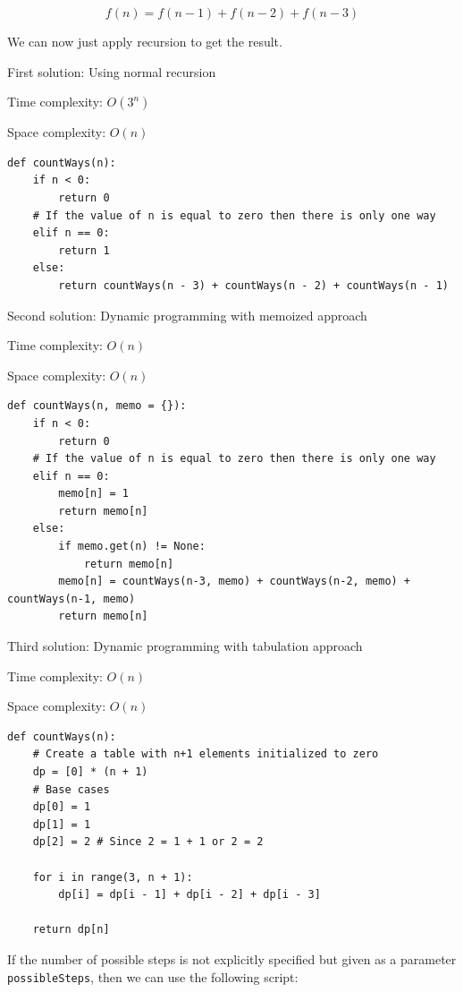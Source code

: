\documentclass[a4paper,11pt]{book}
\begin{document}
$$f(n) = f(n-1)+f(n-2)+f(n-3)$$

\noindent We can now just apply recursion to get the result.
\vspace{3mm}

\noindent First solution: Using normal recursion

\noindent Time complexity: $O(3^n)$

\noindent Space complexity: $O(n)$

\begin{lstlisting}
def countWays(n):
    if n < 0:
        return 0
    # If the value of n is equal to zero then there is only one way
    elif n == 0:
        return 1
    else:
        return countWays(n - 3) + countWays(n - 2) + countWays(n - 1)
\end{lstlisting}

\noindent Second solution: Dynamic programming with memoized approach

\noindent Time complexity: $O(n)$

\noindent Space complexity: $O(n)$

\begin{lstlisting}
def countWays(n, memo = {}):
    if n < 0:
        return 0
    # If the value of n is equal to zero then there is only one way
    elif n == 0:
        memo[n] = 1
        return memo[n]
    else:
        if memo.get(n) != None:
            return memo[n]
        memo[n] = countWays(n-3, memo) + countWays(n-2, memo) + countWays(n-1, memo)
        return memo[n]
\end{lstlisting}

\noindent Third solution: Dynamic programming with tabulation approach

\noindent Time complexity: $O(n)$

\noindent Space complexity: $O(n)$

\begin{lstlisting}
def countWays(n):
    # Create a table with n+1 elements initialized to zero
    dp = [0] * (n + 1)
    # Base cases
    dp[0] = 1
    dp[1] = 1
    dp[2] = 2 # Since 2 = 1 + 1 or 2 = 2
 
    for i in range(3, n + 1):
        dp[i] = dp[i - 1] + dp[i - 2] + dp[i - 3]
 
    return dp[n]
\end{lstlisting}


\noindent If the number of possible steps is not explicitly specified but given as a parameter \lstinline{possibleSteps}, then we can use the following script:
\end{document}
